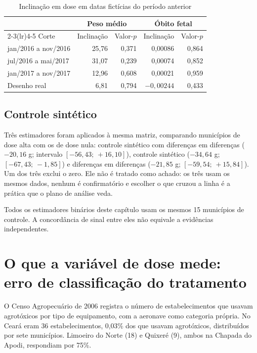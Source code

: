 \begin{table}[htb]
\centering
\caption{Inclinação em dose em datas fictícias do período anterior}
\label{tab:spt}
\small
\begin{tabular}{lrrrr}
\toprule
& \multicolumn{2}{c}{Peso médio} & \multicolumn{2}{c}{Óbito fetal} \\
\cmidrule(lr){2-3}\cmidrule(lr){4-5}
Corte & Inclinação & Valor-$p$ & Inclinação & Valor-$p$ \\
\midrule
jan/2016 a nov/2016 & 25,76 & 0,371 & 0,00086 & 0,864 \\
jul/2016 a mai/2017 & 31,07 & 0,239 & 0,00074 & 0,852 \\
jan/2017 a nov/2017 & 12,96 & 0,608 & 0,00021 & 0,959 \\
\midrule
Desenho real        & 6,81  & 0,794 & $-0{,}00244$ & 0,433 \\
\bottomrule
\end{tabular}
\end{table}

\subsection{Controle sintético}

Três estimadores foram aplicados à mesma matriz, comparando municípios de dose
alta com os de dose nula: controle sintético com diferenças em diferenças
($-20{,}16$ g; intervalo $[-56{,}43;\ +16{,}10]$), controle sintético
($-34{,}64$ g; $[-67{,}43;\ -1{,}85]$) e diferenças em diferenças
($-21{,}85$ g; $[-59{,}54;\ +15{,}84]$). Um dos três exclui o zero. Ele não é
tratado como achado: os três usam os mesmos dados, nenhum é confirmatório e
escolher o que cruzou a linha é a prática que o plano de análise veda.

Todos os estimadores binários deste capítulo usam os mesmos 15 municípios de
controle. A concordância de sinal entre eles não equivale a evidências
independentes.

\section{O que a variável de dose mede: erro de classificação do tratamento}
\label{sec:diluicao}

O Censo Agropecuário de 2006 registra o número de estabelecimentos que usavam
agrotóxicos por tipo de equipamento, com a aeronave como categoria própria. No
Ceará eram 36 estabelecimentos, 0,03\% dos que usavam agrotóxicos, distribuídos
por sete municípios. Limoeiro do Norte (18) e Quixeré (9), ambos na Chapada do
Apodi, respondiam por 75\%.

